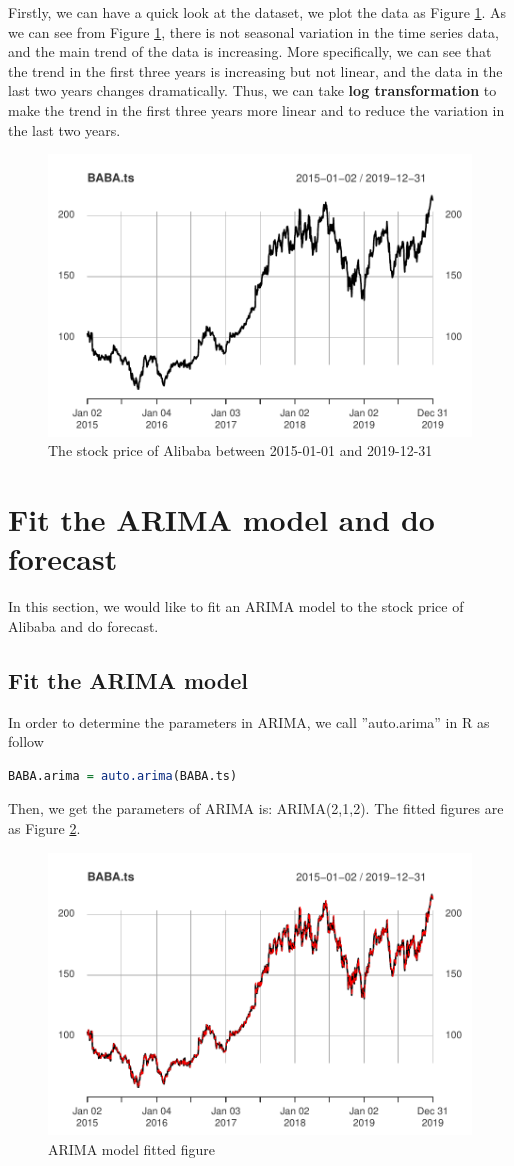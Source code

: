 \documentclass{article}
\begin{document}
Firstly, we can have a quick look at the dataset, we plot the data as Figure \ref{dataset}. As we can see from Figure \ref{dataset}, there is not seasonal variation in the time series data, and the main trend of the data is increasing. 
More specifically, we can see that the trend in the first three years is increasing but not linear, and the data in the last two years changes dramatically. Thus, we can take \textbf{log transformation} to make the trend in the first three years more linear and to reduce the variation in the last two years. 
\begin{figure}[htbp]
    \centering
    \includegraphics[width=0.6\linewidth]{images/dataset}
    \caption{The stock price of Alibaba between 2015-01-01 and 2019-12-31}
    \label{dataset}
\end{figure}
\vspace{4pt}
\section{Fit the ARIMA model and do forecast}
\label{sec3}
In this section, we would like to fit an ARIMA model to the stock price of Alibaba and do forecast.
\vspace{4pt}
\subsection{Fit the ARIMA model} 
In order to determine the parameters in ARIMA, we call ”auto.arima” in R as follow
\begin{lstlisting}[language=R]
BABA.arima = auto.arima(BABA.ts)
\end{lstlisting}
Then, we get the parameters of ARIMA is:
ARIMA(2,1,2). The fitted figures are as Figure \ref{BABA-arima-fit}.
\begin{figure}[htbp]
    \centering
    \includegraphics[width=0.6\linewidth]{images/BABA-arima-fit}
    \caption{ARIMA model fitted figure}
    \label{BABA-arima-fit}
\end{figure}
\end{document}
